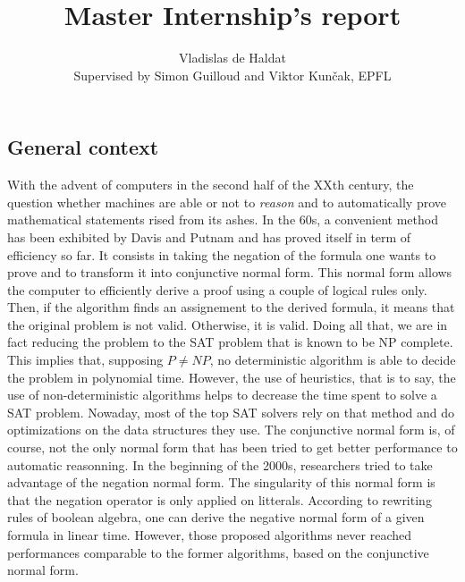 \documentclass[a4paper, 11pt]{article}
\title{Master Internship's report}
\author{Vladislas de Haldat\\Supervised by Simon Guilloud and Viktor Kunčak, EPFL}
\begin{document}
    \maketitle

	\subsection*{General context}
	With the advent of computers in the second half of the XXth century, the question whether 
	machines are able or not to \textit{reason} and to automatically prove mathematical statements 
	rised from its ashes. In the 60s, a convenient method has been exhibited by Davis and Putnam
	and has proved itself in term of efficiency so far. It consists in taking the negation of the
	formula one wants to prove and to transform it into conjunctive normal form. This normal form 
	allows the computer to efficiently derive a proof using a couple of logical rules only. Then, if 
	the algorithm finds an assignement to the derived formula, it means that the original problem 
	is not valid. Otherwise, it is valid. Doing all that, we are in fact
	reducing the problem to the SAT problem that is known to be NP complete. This implies that,
	supposing $P\neq NP$, no deterministic algorithm is able to decide the problem in polynomial
	time. However, the use of heuristics, that is to say, the use of non-deterministic algorithms
	helps to decrease the time spent to solve a SAT problem. Nowaday, most of the top SAT solvers
	rely on that method and do optimizations on the data structures they use.
	The conjunctive normal form is, of course,
	not the only normal form that has been tried to get better performance to automatic reasonning.
	In the beginning of the 2000s, researchers tried to take advantage of the negation normal form.
	The singularity of this normal form is that the negation operator is only applied on litterals.
	According to rewriting rules of boolean algebra, one can derive the negative normal form of a
	given formula in linear time. However, those proposed algorithms never reached performances
	comparable to the former algorithms, based on the conjunctive normal form. 
\end{document}
